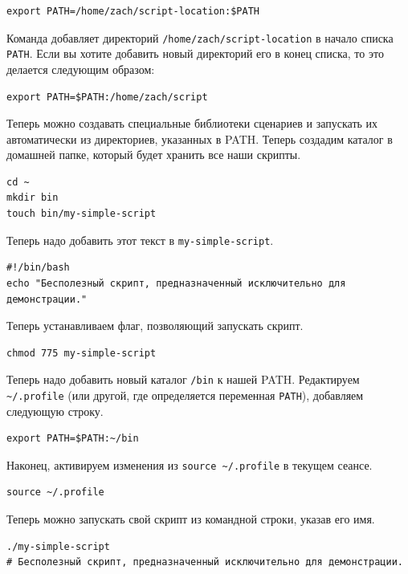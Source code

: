 \documentclass[12pt]{article}
\begin{document}
\begin{verbatim}
export PATH=/home/zach/script-location:$PATH
\end{verbatim}

Команда добавляет директорий \texttt{/home/zach/script-location} в
начало списка \texttt{PATH}. Если вы хотите добавить новый директорий
его в конец списка, то это делается следующим образом:

\begin{verbatim}
export PATH=$PATH:/home/zach/script
\end{verbatim}

Теперь можно создавать специальные библиотеки сценариев и запускать их
автоматически из директориев, указанных в PATH. Теперь создадим каталог
в домашней папке, который будет хранить все наши скрипты.

\begin{verbatim}
cd ~
mkdir bin
touch bin/my-simple-script
\end{verbatim}

Теперь надо добавить этот текст в \texttt{my-simple-script}.

\begin{verbatim}
#!/bin/bash
echo "Бесполезный скрипт, предназначенный исключительно для демонстрации."
\end{verbatim}

Теперь устанавливаем флаг, позволяющий запускать скрипт.

\begin{verbatim}
chmod 775 my-simple-script
\end{verbatim}

Теперь надо добавить новый каталог \texttt{/bin} к нашей PATH.
Редактируем \texttt{\textasciitilde{}/.profile} (или другой, где
определяется переменная \texttt{PATH}), добавляем следующую строку.

\begin{verbatim}
export PATH=$PATH:~/bin
\end{verbatim}

Наконец, активируем изменения из
\texttt{source\ \textasciitilde{}/.profile} в текущем сеансе.

\begin{verbatim}
source ~/.profile
\end{verbatim}

Теперь можно запускать свой скрипт из командной строки, указав его имя.

\begin{verbatim}
./my-simple-script
# Бесполезный скрипт, предназначенный исключительно для демонстрации.
\end{verbatim}
\end{document}
